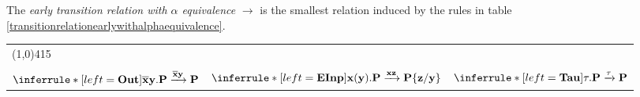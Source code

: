 \begin{definition}
  The \emph{early transition relation with $\alpha$ equivalence} $\rightarrow$ is the smallest relation induced by the rules in table \ref{transitionrelationearlywithalphaequivalence}.

  \begin{table}
    \begin{tabular}{lll}  
      	\multicolumn{3}{l}{\line(1,0){415}}\\\\
	  $\inferrule* [left=\bf{Out}]{
	  }{
	    \overline{x}y.P \xrightarrow{\overline{x}y} P
	  }$
	&
	  $\inferrule* [left=\bf{EInp}]{
	  }{
	    x(y).P \xrightarrow{xz} P\{z/y\}
	  }$
	&
	  $\inferrule* [left=\bf{Tau}]{
	  }{
	    \tau.P \xrightarrow{\tau} P
	  }$
      \\
    \end{tabular}
    \\
\end{table}
\end{definition}
